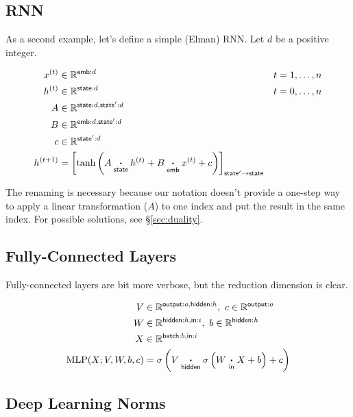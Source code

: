 \documentclass{article}
\newcommand{\name}[1]{\mathsf{#1}}
\newcommand{\ndot}[1]{\mathbin{\mathop{\thinspace\boldsymbol\cdot\thinspace}\displaylimits_{\name{#1}}}}
\newcommand{\reals}{\mathbb{R}}
\begin{document}
\subsection{RNN}
\label{sec:rnn}

As a second example, let's define a simple (Elman) RNN. Let $d$ be a positive integer.

\begin{align*}
x^{(t)} &\in \mathbb{R}^{\name{emb}: d} & t &= 1, \ldots, n \\
h^{(t)} &\in \mathbb{R}^{\name{state}: d} & t &= 0, \ldots, n\\
A &\in \mathbb{R}^{\name{state}: d, \name{state'}: d} \\
B &\in \mathbb{R}^{\name{emb}: d, \name{state'}: d} \\
c &\in \mathbb{R}^{\name{state'}: d} \\
h^{(t+1)} &= \left[ \tanh\left( A \ndot{state} h^{(t)} + B \ndot{emb} x^{(t)} + c \right) \right]_{\name{state'} \rightarrow \name{state}}
\end{align*}

The renaming is necessary because our notation doesn't provide a one-step way to apply a linear transformation ($A$) to one index and put the result in the same index. For possible solutions, see \S\ref{sec:duality}.

\subsection{Fully-Connected Layers}

Fully-connected layers are bit more verbose, but the reduction dimension is clear.

\begin{align*} 
V &\in \reals^{\name{output}:o, \name{hidden}:h},\ c\in \reals^{\name{output}:o} \\
W &\in \reals^{{\name{hidden}:h, \name{in}:i}}, \ b \in \reals^{\name{hidden}:h} \\
X &\in \reals^{{\name{batch}:b, \name{in}:i}} \\
\text{MLP}(X; V, W,b, c) &= \sigma \left( V \ndot{hidden} \sigma \left( W \ndot{in} X + b \right) + c \right)  
\end{align*}

\subsection{Deep Learning Norms}
\end{document}
